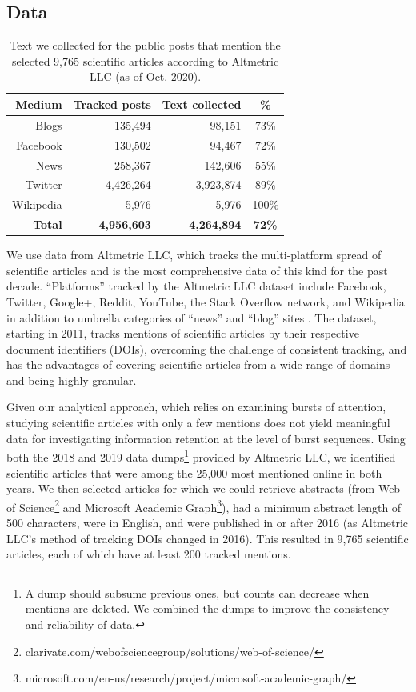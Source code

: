 \documentclass[letterpaper]{article} %
\begin{document}
\subsection{Data}
\begin{table}[t]
    \centering
    \begin{tabular}{r|r|r|c}
         \textbf{Medium} & \textbf{Tracked posts} & \textbf{Text collected} & \textbf{\%} \\
         \hline
         Blogs & 135,494 & 98,151 & 73\% \\
         Facebook & 130,502 & 94,467 & 72\% \\
         News & 258,367 & 142,606 &  55\% \\ 
         Twitter & 4,426,264 & 3,923,874 & 89\% \\
         Wikipedia & 5,976 & 5,976 & 100\% \\
         \hline
         \textbf{Total} & \textbf{4,956,603} & \textbf{4,264,894} & \textbf{72\%}\\
    \end{tabular}
    \caption{Text we collected for the public posts that mention the selected 9,765 scientific articles according to Altmetric LLC (as of Oct. 2020).}
    \label{tab:collected_data_nums}
\end{table}

We use data from Altmetric LLC, which tracks the multi-platform spread of scientific articles and is the most comprehensive data of this kind for the past decade. ``Platforms'' tracked by the Altmetric LLC dataset include Facebook, Twitter, Google+, Reddit, YouTube, the Stack Overflow network, and Wikipedia in addition to umbrella categories of ``news'' and ``blog'' sites \cite{altmetricsupportOurDataOur2021}. The dataset, starting in 2011, tracks mentions of scientific articles by their respective document identifiers (DOIs), overcoming the challenge of consistent tracking, and has the advantages of covering scientific articles from a wide range of domains and being highly granular.

Given our analytical approach, which relies on examining bursts of attention, studying scientific articles with only a few mentions does not yield meaningful data for investigating information retention at the level of burst sequences. Using both the 2018 and 2019 data dumps\footnote{A dump should subsume previous ones, but counts can decrease when mentions are deleted. We combined the dumps to improve the consistency and reliability of data.} provided by Altmetric LLC, we identified scientific articles that were among the 25,000 most mentioned online in both years. We then selected articles for which we could retrieve abstracts (from Web of Science\footnote{clarivate.com/webofsciencegroup/solutions/web-of-science/} and Microsoft Academic Graph\footnote{microsoft.com/en-us/research/project/microsoft-academic-graph/}), had a minimum abstract length of 500 characters, were in English, and were published in or after 2016 (as Altmetric LLC's method of tracking DOIs changed in 2016). This resulted in 9,765 scientific articles, each of which have at least 200 tracked mentions.
\end{document}
